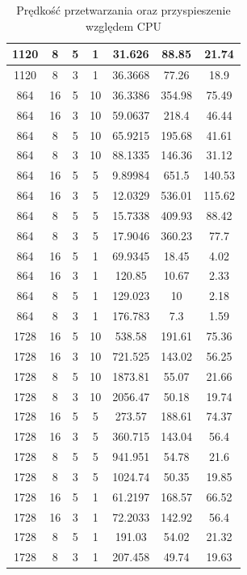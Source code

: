 \documentclass[12pt,a4paper]{article}
\begin{document}
\begin{table}[H]
\begin{adjustbox}{totalheight=\textheight-\baselineskip}
\begin{tabular}{|c|c|c|c|c|c|c|}
1120	&	8	&	5	&	1	&	31.626	&	88.85	&	21.74	\\ \hline
1120	&	8	&	3	&	1	&	36.3668	&	77.26	&	18.9	\\ \hline
864	&	16	&	5	&	10	&	36.3386	&	354.98	&	75.49	\\ \hline
864	&	16	&	3	&	10	&	59.0637	&	218.4	&	46.44	\\ \hline
864	&	8	&	5	&	10	&	65.9215	&	195.68	&	41.61	\\ \hline
864	&	8	&	3	&	10	&	88.1335	&	146.36	&	31.12	\\ \hline
864	&	16	&	5	&	5	&	9.89984	&	651.5	&	140.53	\\ \hline
864	&	16	&	3	&	5	&	12.0329	&	536.01	&	115.62	\\ \hline
864	&	8	&	5	&	5	&	15.7338	&	409.93	&	88.42	\\ \hline
864	&	8	&	3	&	5	&	17.9046	&	360.23	&	77.7	\\ \hline
864	&	16	&	5	&	1	&	69.9345	&	18.45	&	4.02	\\ \hline
864	&	16	&	3	&	1	&	120.85	&	10.67	&	2.33	\\ \hline
864	&	8	&	5	&	1	&	129.023	&	10	&	2.18	\\ \hline
864	&	8	&	3	&	1	&	176.783	&	7.3	&	1.59	\\ \hline
1728	&	16	&	5	&	10	&	538.58	&	191.61	&	75.36	\\ \hline
1728	&	16	&	3	&	10	&	721.525	&	143.02	&	56.25	\\ \hline
1728	&	8	&	5	&	10	&	1873.81	&	55.07	&	21.66	\\ \hline
1728	&	8	&	3	&	10	&	2056.47	&	50.18	&	19.74	\\ \hline
1728	&	16	&	5	&	5	&	273.57	&	188.61	&	74.37	\\ \hline
1728	&	16	&	3	&	5	&	360.715	&	143.04	&	56.4	\\ \hline
1728	&	8	&	5	&	5	&	941.951	&	54.78	&	21.6	\\ \hline
1728	&	8	&	3	&	5	&	1024.74	&	50.35	&	19.85	\\ \hline
1728	&	16	&	5	&	1	&	61.2197	&	168.57	&	66.52	\\ \hline
1728	&	16	&	3	&	1	&	72.2033	&	142.92	&	56.4	\\ \hline
1728	&	8	&	5	&	1	&	191.03	&	54.02	&	21.32	\\ \hline
1728	&	8	&	3	&	1	&	207.458	&	49.74	&	19.63	\\ \hline
\end{tabular}
\end{adjustbox}
\caption{Prędkość przetwarzania oraz przyspieszenie względem CPU}
\label{table:all}
\end{table}
\end{document}
